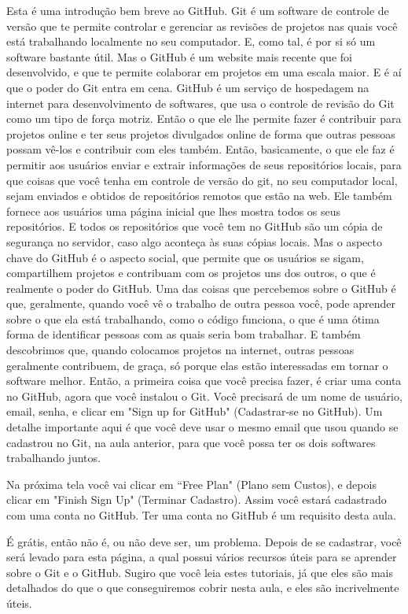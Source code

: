 Esta é uma introdução bem breve ao GitHub. Git é um software de controle de versão que te permite controlar e gerenciar as revisões de projetos nas quais você está trabalhando localmente no seu computador. E, como tal, é por si só um software bastante útil. Mas o GitHub é um website mais recente que foi desenvolvido, e que te permite colaborar em projetos em uma escala maior. E é aí que o poder do Git entra em cena. GitHub é um serviço de hospedagem na internet para desenvolvimento de softwares, que usa o controle de revisão do Git como um tipo de força motriz. Então o que ele lhe permite fazer é contribuir para projetos online e ter seus projetos divulgados online de forma que outras pessoas possam vê-los e contribuir com eles também. Então, basicamente, o que ele faz é permitir aos usuários enviar e extrair informações  de seus repositórios locais, para que coisas que você tenha em controle de versão do git, no seu computador local, sejam enviados e obtidos de repositórios remotos que estão na web. Ele também fornece aos usuários uma página inicial que lhes mostra todos os seus repositórios. E todos os repositórios que você tem no GitHub são um cópia de segurança no servidor, caso algo aconteça às suas cópias locais. Mas o aspecto chave do GitHub é o aspecto social, que permite que os usuários se sigam, compartilhem projetos e contribuam com os projetos uns dos outros, o que é realmente o poder do GitHub. Uma das coisas que percebemos sobre o GitHub é que, geralmente, quando você vê o trabalho de outra pessoa você, pode aprender sobre o que ela está trabalhando, como o código funciona, o que é uma ótima forma de identificar pessoas com as quais seria bom trabalhar. E também descobrimos que, quando colocamos projetos na internet, outras pessoas geralmente contribuem, de graça, só porque elas estão interessadas em tornar o software melhor. Então, a primeira coisa que você precisa fazer, é criar uma conta no GitHub, agora que você instalou o Git. Você precisará de um nome de usuário, email, senha, e clicar em "Sign up for GitHub" (Cadastrar-se no GitHub). Um detalhe importante aqui é que você deve usar o mesmo email que usou quando se cadastrou no Git, na aula anterior, para que você possa ter os dois softwares trabalhando juntos. 

Na próxima tela você vai clicar em ``Free Plan" (Plano sem Custos), e depois clicar em "Finish Sign Up" (Terminar Cadastro). Assim você estará cadastrado com uma conta no GitHub. Ter uma conta no GitHub é um requisito desta aula. 

É grátis, então não é, ou não deve ser, um problema. Depois de se cadastrar, você será levado para esta página, a qual possui vários recursos úteis para se aprender sobre o Git e o GitHub. Sugiro que você leia estes tutoriais, já que eles são mais detalhados do que o que conseguiremos cobrir nesta aula, e eles são incrivelmente úteis. 

